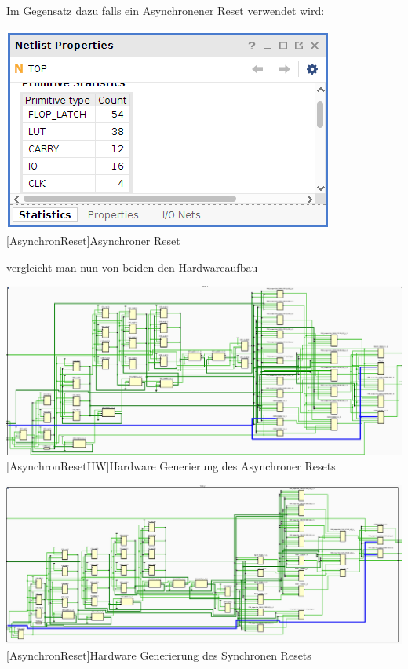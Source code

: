 \documentclass[12pt,a4paper,bibliography=totoc,listof=totoc]{scrartcl}
\begin{document}
Im Gegensatz dazu falls ein Asynchronener Reset verwendet wird:

\vspace{1em}
\begin{minipage}{\linewidth}
	\centering
	\includegraphics[width=0.5\linewidth]{pics/AsynchronousNetList.png}
	[AsynchronReset]{Asynchroner Reset}
	\label{fig: Asynchroner Reset}
\end{minipage}

vergleicht man nun von beiden den Hardwareaufbau

\vspace{1em}
\begin{minipage}{\linewidth}
	\centering
	\includegraphics[width=1.0\linewidth]{pics/FullSchematicAsynchronusly.png}
	[AsynchronResetHW]{Hardware Generierung des Asynchroner Resets}
	\label{fig: Asynchroner Reset HW}
\end{minipage}


\vspace{1em}
\begin{minipage}{\linewidth}
	\centering
	\includegraphics[width=1.0\linewidth]{pics/FullSchmeaticSyncronous.png}
	[AsynchronReset]{Hardware Generierung des Synchronen Resets}
	\label{fig:Synchroner Reset HW}
\end{minipage}
\end{document}
